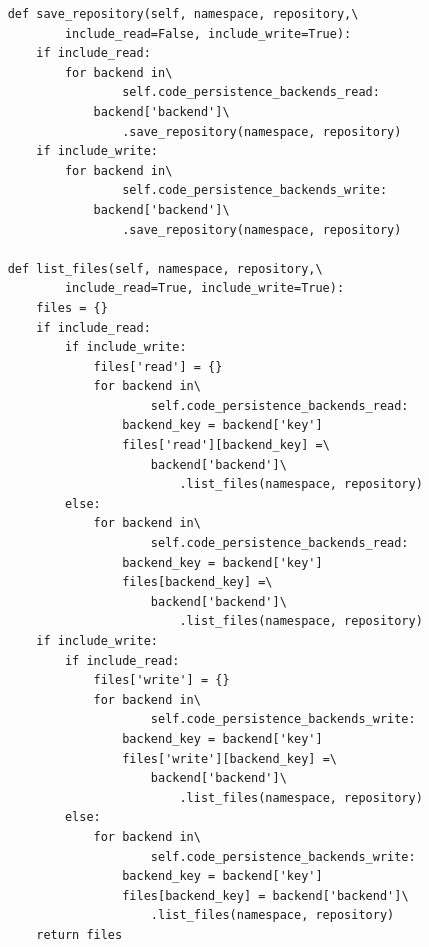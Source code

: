 \begin{lstlisting}
    def save_repository(self, namespace, repository,\
            include_read=False, include_write=True):
        if include_read:
            for backend in\
                    self.code_persistence_backends_read:
                backend['backend']\
                    .save_repository(namespace, repository)
        if include_write:
            for backend in\
                    self.code_persistence_backends_write:
                backend['backend']\
                    .save_repository(namespace, repository)

    def list_files(self, namespace, repository,\
            include_read=True, include_write=True):
        files = {}
        if include_read:
            if include_write:
                files['read'] = {}
                for backend in\
                        self.code_persistence_backends_read:
                    backend_key = backend['key']
                    files['read'][backend_key] =\
                        backend['backend']\
                            .list_files(namespace, repository)
            else:
                for backend in\
                        self.code_persistence_backends_read:
                    backend_key = backend['key']
                    files[backend_key] =\
                        backend['backend']\
                            .list_files(namespace, repository)
        if include_write:
            if include_read:
                files['write'] = {}
                for backend in\
                        self.code_persistence_backends_write:
                    backend_key = backend['key']
                    files['write'][backend_key] =\
                        backend['backend']\
                            .list_files(namespace, repository)
            else:
                for backend in\
                        self.code_persistence_backends_write:
                    backend_key = backend['key']
                    files[backend_key] = backend['backend']\
                        .list_files(namespace, repository)
        return files


\end{lstlisting}
